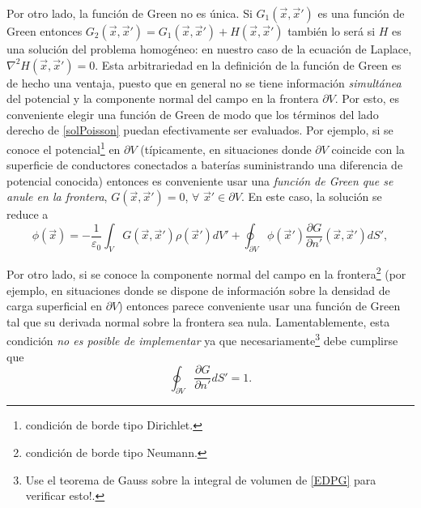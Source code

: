 Por otro lado, la función de Green no es única. Si $G_1(\vec{x},\vec{x}')$ es una función de Green entonces $G_2(\vec{x},\vec{x}')=G_1(\vec{x},\vec{x}')+H(\vec{x},\vec{x}')$ también lo será si $H$ es una solución del problema homogéneo: en nuestro caso de la ecuación de Laplace, $\nabla^2H(\vec{x},\vec{x}')=0$. Esta arbitrariedad en la definición de la función de Green es de hecho una ventaja, puesto que en general no se tiene información \textit{simultánea} del potencial y la componente normal del campo en la frontera $\partial V$. Por esto, es conveniente elegir una función de Green de modo que los términos del lado derecho de \eqref{solPoisson} puedan efectivamente ser evaluados. Por ejemplo, si se conoce el potencial\footnote{condición de borde tipo Dirichlet.} en $\partial V$ (típicamente, en situaciones donde $\partial V$ coincide con la superficie de conductores conectados a baterías suministrando una diferencia de potencial conocida) entonces es conveniente usar una \textit{función de Green que se anule en la frontera}, $G(\vec{x},\vec{x}')=0$, $\forall$ $\vec{x}'\in\partial V$. En este caso, la solución se reduce a
\begin{equation}\label{solPoissonDirichlet}
\phi(\vec{x})= -\frac{1}{\varepsilon_0}\int_VG(\vec{x},\vec{x}') \rho(\vec{x}')dV'+\oint_{\partial V}\phi(\vec{x}')\frac{\partial G}{\partial n'}(\vec{x},\vec{x}')dS',
\end{equation}

 Por otro lado, si se conoce la componente normal del campo en la frontera\footnote{condición de borde tipo Neumann.} (por ejemplo, en situaciones donde se dispone de información sobre la densidad de carga superficial en $\partial V$) entonces parece conveniente usar una función de Green tal que su derivada normal sobre la frontera sea nula. Lamentablemente, esta condición \textit{no es posible de implementar} ya que necesariamente\footnote{Use el teorema de Gauss sobre la integral de volumen de \eqref{EDPG} para verificar esto!.} debe cumplirse que
\begin{equation}\label{intGn}
\oint_{\partial V}\frac{\partial G}{\partial n'}dS'=1.
\end{equation}


